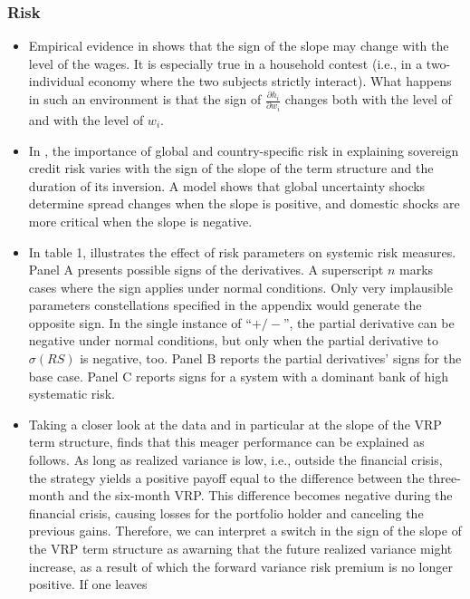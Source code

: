 \documentclass[11pt]{book}
\begin{document}
\subsubsection{Risk}
\begin{itemize}
\item Empirical evidence in \cite{mariotti2016job}
shows that the sign of the slope may change with the level of the
wages. It is especially true in a household contest (i.e., in a two-individual
economy where the two subjects strictly interact). What happens in
such an environment is that the sign of $\frac{\partial h_{i}}{\partial w_{i}}$
changes both with the level of and with the level of $w_{i}$.
\item In \cite{augustin2018term},
the importance of global and country-specific risk in explaining sovereign
credit risk varies with the sign of the slope of the term structure
and the duration of its inversion. A model shows that global uncertainty
shocks determine spread changes when the slope is positive, and domestic
shocks are more critical when the slope is negative.
\item In table 1, \cite{loffler2018pitfalls}
illustrates the effect of risk parameters on systemic risk measures.
Panel A presents possible signs of the derivatives. A superscript
$n$ marks cases where the sign applies under normal conditions. Only
very implausible parameters constellations specified in the appendix
would generate the opposite sign. In the single instance of \textquotedblleft$+/-$\textquotedblright,
the partial derivative can be negative under normal conditions, but
only when the partial derivative to $\sigma(RS)$ is negative, too.
Panel B reports the partial derivatives\textquoteright{} signs for
the base case. Panel C reports signs for a system with a dominant
bank of high systematic risk.
\item Taking a closer look at the data and in particular at the slope of
the VRP term structure, \cite{bardgett2019inferring}
finds that this meager performance can be explained as follows. As
long as realized variance is low, i.e., outside the financial crisis,
the strategy yields a positive payoff equal to the difference between
the three-month and the six-month VRP. This difference becomes negative
during the financial crisis, causing losses for the portfolio holder
and canceling the previous gains. Therefore, we can interpret a switch
in the sign of the slope of the VRP term structure as awarning that
the future realized variance might increase, as a result of which
the forward variance risk premium is no longer positive. If one leaves

\end{itemize}
\end{document}
